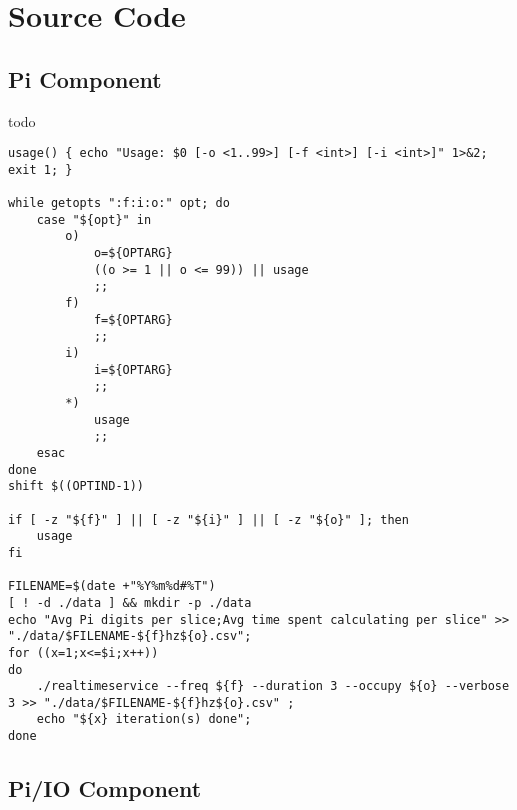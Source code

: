 \chapter{Source Code}
\section{Pi Component}
todo 
\begin{lstlisting}[frame=single]
usage() { echo "Usage: $0 [-o <1..99>] [-f <int>] [-i <int>]" 1>&2; exit 1; }

while getopts ":f:i:o:" opt; do
    case "${opt}" in
        o)
            o=${OPTARG}
            ((o >= 1 || o <= 99)) || usage
            ;;
        f)
            f=${OPTARG}
            ;;
        i)
            i=${OPTARG}
            ;;
        *)
            usage
            ;;
    esac
done
shift $((OPTIND-1))

if [ -z "${f}" ] || [ -z "${i}" ] || [ -z "${o}" ]; then
    usage
fi

FILENAME=$(date +"%Y%m%d#%T")
[ ! -d ./data ] && mkdir -p ./data
echo "Avg Pi digits per slice;Avg time spent calculating per slice" >> "./data/$FILENAME-${f}hz${o}.csv";
for ((x=1;x<=$i;x++))
do
	./realtimeservice --freq ${f} --duration 3 --occupy ${o} --verbose 3 >> "./data/$FILENAME-${f}hz${o}.csv" ;
	echo "${x} iteration(s) done";
done
\end{lstlisting}


\section{Pi/IO Component}
